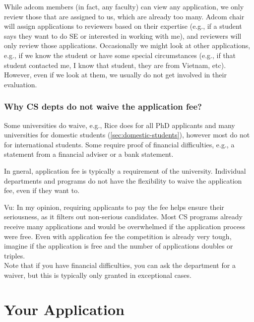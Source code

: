 \documentclass[oneside,11pt,dvipsnames]{book}
\newenvironment{commentbox}[1][]{
  \small
  \begin{mybox}
    {\small \textbf{#1}}
  }{
  \end{mybox}
}
\def\chapterinfo#1{%
  \addcontentsline{toc}{chapterinfo}{%
    \noexpand\numberline{}\color{black}{#1}}%
}
\begin{document}
While adcom members (in fact, any faculty) can view any application, we only review those that are assigned to us, which are already too many. Adcom chair will assign applications to reviewers based on their expertise (e.g., if a student says they want to do SE or interested in working with me), and reviewers will only review those applications. Occasionally we might look at other applications, e.g., if we know the student or have some special circumstances (e.g., if that student contacted me, I know that student, they are from Vietnam, etc). However, even if we look at them, we usually do not get involved in their evaluation.

\subsection{Why CS depts do not waive the application fee?}  

Some universities do waive, e.g., Rice does for all PhD applicants and many universities for domestic students (\autoref{sec:domestic-students}), however most do not for international students.
Some require proof of financial difficulties, e.g., a statement from a financial adviser or a bank statement.

In gneral, application fee is typically a requirement of the university. Individual departments and programs do not have the flexibility to waive the application fee, even if they want to.

\begin{commentbox}{Vu:}
In my opinion, requiring applicants to pay the fee helps ensure their seriousness, as it filters out non-serious candidates. Most CS programs already receive many applications and would be overwhelmed if the application process were free.  Even with application fee the competition is already very tough, imagine if the application is free and the number of applications doubles or triples.\\

Note that if you have financial difficulties, you can ask the department for a waiver, but this is typically only granted in exceptional cases.
\end{commentbox}



\chapter{Your Application}\label{sec:application}

\chapterinfo{The committee will look at various factors, but the most important ones are letters of recommendation (LORs),  statements of purpose (SOP), and research experience and potential, e.g., publications.}
\end{document}

